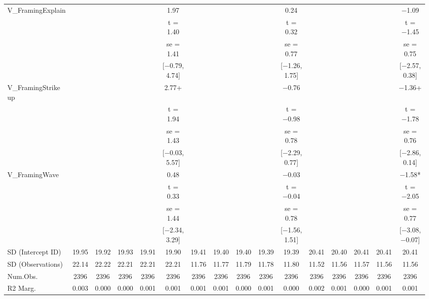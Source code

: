 \documentclass[]{report}
\begin{document}
\begin{table}
{\begin{tabular}[t]{lccccccccccccccc}
		V\_FramingExplain &  &  &  &  & \num{1.97} &  &  &  &  & \num{0.24} &  &  &  &  & \num{-1.09}\\
		&  &  &  &  & t = \num{1.40} &  &  &  &  & t = \num{0.32} &  &  &  &  & t = \num{-1.45}\\
		&  &  &  &  & se = \num{1.41} &  &  &  &  & se = \num{0.77} &  &  &  &  & se = \num{0.75}\\
		&  &  &  &  & {}[\num{-0.79}, \num{4.74}] &  &  &  &  & {}[\num{-1.26}, \num{1.75}] &  &  &  &  & {}[\num{-2.57}, \num{0.38}]\\
		V\_FramingStrike up &  &  &  &  & \num{2.77}+ &  &  &  &  & \num{-0.76} &  &  &  &  & \num{-1.36}+\\
		&  &  &  &  & t = \num{1.94} &  &  &  &  & t = \num{-0.98} &  &  &  &  & t = \num{-1.78}\\
		&  &  &  &  & se = \num{1.43} &  &  &  &  & se = \num{0.78} &  &  &  &  & se = \num{0.76}\\
		&  &  &  &  & {}[\num{-0.03}, \num{5.57}] &  &  &  &  & {}[\num{-2.29}, \num{0.77}] &  &  &  &  & {}[\num{-2.86}, \num{0.14}]\\
		V\_FramingWave &  &  &  &  & \num{0.48} &  &  &  &  & \num{-0.03} &  &  &  &  & \num{-1.58}*\\
		&  &  &  &  & t = \num{0.33} &  &  &  &  & t = \num{-0.04} &  &  &  &  & t = \num{-2.05}\\
		&  &  &  &  & se = \num{1.44} &  &  &  &  & se = \num{0.78} &  &  &  &  & se = \num{0.77}\\
		&  &  &  &  & {}[\num{-2.34}, \num{3.29}] &  &  &  &  & {}[\num{-1.56}, \num{1.51}] &  &  &  &  & {}[\num{-3.08}, \num{-0.07}]\\
		SD (Intercept ID) & \num{19.95} & \num{19.92} & \num{19.93} & \num{19.91} & \num{19.90} & \num{19.41} & \num{19.40} & \num{19.40} & \num{19.39} & \num{19.39} & \num{20.41} & \num{20.40} & \num{20.41} & \num{20.41} & \num{20.41}\\
		SD (Observations) & \num{22.14} & \num{22.22} & \num{22.21} & \num{22.21} & \num{22.21} & \num{11.76} & \num{11.77} & \num{11.79} & \num{11.78} & \num{11.80} & \num{11.52} & \num{11.56} & \num{11.57} & \num{11.56} & \num{11.56}\\
		\midrule
		Num.Obs. & \num{2396} & \num{2396} & \num{2396} & \num{2396} & \num{2396} & \num{2396} & \num{2396} & \num{2396} & \num{2396} & \num{2396} & \num{2396} & \num{2396} & \num{2396} & \num{2396} & \num{2396}\\
		R2 Marg. & \num{0.003} & \num{0.000} & \num{0.000} & \num{0.001} & \num{0.001} & \num{0.001} & \num{0.001} & \num{0.000} & \num{0.001} & \num{0.000} & \num{0.002} & \num{0.001} & \num{0.000} & \num{0.001} & \num{0.001}\\

\end{tabular}}
\end{table}
\end{document}
